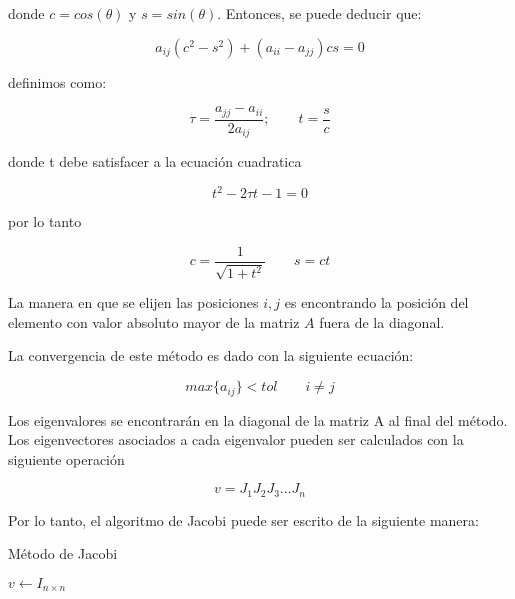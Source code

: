 donde $c=cos(\theta)$ y $s=sin(\theta)$. Entonces, se puede deducir que:

\begin{equation*}
    a_{ij}(c^2-s^2) + (a_{ii}-a_{jj})cs = 0
\end{equation*}

definimos como:

\begin{equation*}
    \tau = \frac{a_{jj}-a_{ii}}{2a_{ij}} ; \qquad t = \frac{s}{c}
\end{equation*}

donde t debe satisfacer a la ecuación cuadratica

\begin{equation*}
    t^2 - 2\tau t -1 =0
\end{equation*}

por lo tanto

\begin{equation*}
    c = \frac{1}{\sqrt{1+t^2}} \qquad s =ct
\end{equation*}

La manera en que se elijen las posiciones $i,j$ es encontrando la posición del elemento con valor absoluto mayor de la matriz $A$ fuera de la diagonal.

La convergencia de este método es dado con la siguiente ecuación:

\begin{equation*}
    max\{a_{ij}\} < tol \qquad i\neq j
\end{equation*}

Los eigenvalores se encontrarán en la diagonal de la matriz A al final del método. Los eigenvectores asociados a cada eigenvalor pueden ser calculados con la siguiente operación

\begin{equation*}
    v = J_1J_2J_3\dots J_n
\end{equation*}

Por lo tanto, el algoritmo de Jacobi puede ser escrito de la siguiente manera:

\begin{algorithm}[H]
    \caption{Método de Jacobi}
    \label{alg:jacobi_method}
    $v \gets I_{n\times n}$\\
\end{algorithm}
